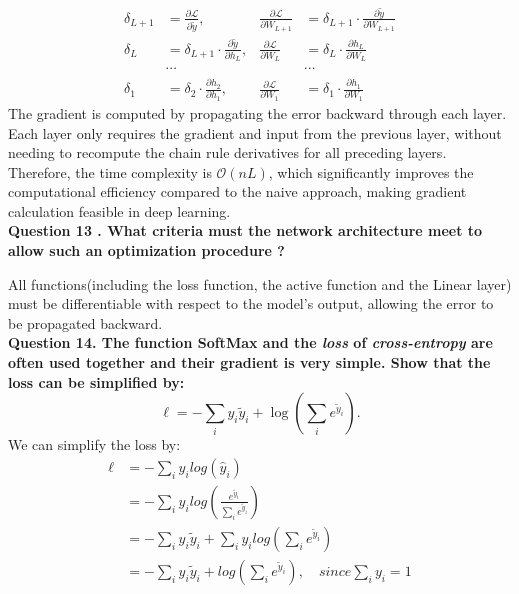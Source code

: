\documentclass{article}
\begin{document}
\begin{align*}
\delta_{L+1} & = \frac{\partial\mathcal{L}}{\partial \tilde{y}}, & 
\frac{\partial\mathcal{L}}{\partial W_{L+1}} & = \delta_{L+1}\cdot \frac{\partial\tilde{y}}{\partial W_{L+1}} \\
\delta_{L} & = \delta_{L+1}\cdot \frac{\partial\tilde{y}}{\partial h_{L}}, &
\frac{\partial\mathcal{L}}{\partial W_{L}} & = \delta_{L}\cdot \frac{\partial h_{L}}{\partial W_{L}} \\
&\cdots&&\cdots \\
\delta_{1} & = \delta_{2}\cdot \frac{\partial h_2}{\partial h_{1}}, & 
\frac{\partial\mathcal{L}}{\partial W_{1}} & = \delta_{1}\cdot \frac{\partial h_{1}}{\partial W_{1}}
\end{align*}
The gradient is computed by propagating the error backward through each layer. Each layer only requires the gradient and input from the previous layer, without needing to recompute the chain rule derivatives for all preceding layers. Therefore, the time complexity is  \(\mathcal{O}(nL)\), which significantly improves the computational efficiency compared to the naive approach, making gradient calculation feasible in deep learning.   \\

\noindent \textbf{Question 13 . What criteria must the network architecture meet to allow such an optimization procedure ?}

All functions(including the loss function, the active function and the Linear layer) must be differentiable with respect to the model's output, allowing the error to be propagated backward. \\

\noindent \textbf{Question 14. The function SoftMax and the \textit{loss} of \textit{cross-entropy} are often used together and their gradient is very simple. Show that the loss can be simplified by:
\[
\ell = -\sum_i y_i \tilde{y}_i + \log \left( \sum_i e^{\tilde{y}_i} \right).
\]}
We can simplify the loss by:
\begin{align*}
\ell
&= -\sum_{i}y_i log(\hat{y}_i)\\
&= -\sum_{i}y_i log (\frac{e^{\tilde{y}_i}}{\sum_i e^{\tilde{y}_i}})\\
&=-\sum_{i}y_i\tilde{y}_i + \sum_{i}y_i log(\sum_{i}e^{\tilde{y}_i})\\
&=-\sum_{i}y_i\tilde{y}_i + log(\sum_{i}e^{\tilde{y}_i}), \quad since \sum_{i}y_i=1
\end{align*}\\
\end{document}
